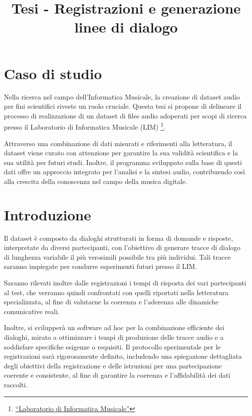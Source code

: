\documentclass[
]{article}
\title{Tesi - Registrazioni e generazione linee di dialogo}
\author{}
\date{}
\begin{document}
\maketitle

{
\setcounter{tocdepth}{2}
\tableofcontents
}
\section{Caso di studio}\label{caso-di-studio}

Nella ricerca nel campo dell'Informatica Musicale, la creazione di dataset audio per fini scientifici riveste un ruolo cruciale. Questa tesi si propone di delineare il processo di realizzazione di un dataset di files audio adoperati per scopi di ricerca presso il Laboratorio di Informatica Musicale (LIM) \footnote{\href{https://www.lim.di.unimi.it/}{``Laboratorio di Informatica Musicale''}}.

Attraverso una combinazione di dati misurati e riferimenti alla letteratura, il dataset viene curato con attenzione per garantire la sua validità scientifica e la sua utilità per futuri studi. Inoltre, il programma sviluppato sulla base di questi dati offre un approccio integrato per l'analisi e la sintesi audio, contribuendo così alla crescita della conoscenza nel campo della musica digitale.

\section{Introduzione}\label{introduzione}

Il dataset è composto da dialoghi strutturati in forma di domande e risposte, interpretate da diversi partecipanti, con l'obiettivo di generare tracce di dialogo di lunghezza variabile il più verosimili possibile tra più individui. Tali tracce saranno impiegate per condurre esperimenti futuri presso il LIM.

Saranno rilevati inoltre dalle registrazioni i tempi di risposta dei vari partecipanti al test, che verranno quindi confrontati con quelli riportati nella letteratura specializzata, al fine di valutarne la coerenza e l'aderenza alle dinamiche comunicative reali.

Inoltre, si svilupperà un software ad hoc per la combinazione efficiente dei dialoghi, mirato a ottimizzare i tempi di produzione delle tracce audio e a soddisfare specifiche esigenze o requisiti. Il protocollo sperimentale per le registrazioni sarà rigorosamente definito, includendo una spiegazione dettagliata degli obiettivi della registrazione e delle istruzioni per una partecipazione coerente e consistente, al fine di garantire la coerenza e l'affidabilità dei dati raccolti.
\end{document}
